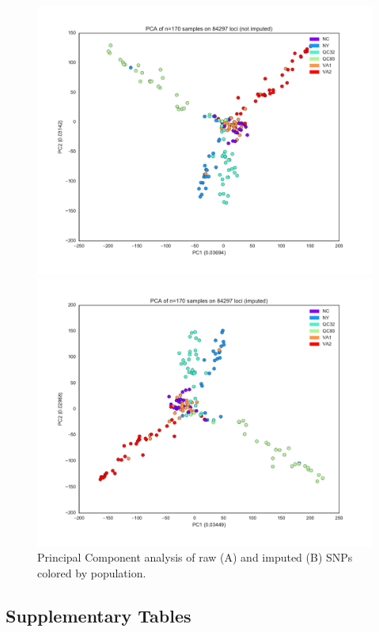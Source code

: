 \documentclass[smallextended]{svjour3}
\begin{document}
\begin{figure}
\begin{minipage}[b]{.5\linewidth}
	\centering
	\includegraphics[width=\textwidth]{not_imputed}	
	\subcaption{}
\end{minipage}
\hfill
\begin{minipage}[b]{.5\linewidth}
	\centering
	\includegraphics[width=\textwidth]{imputed}	
	\subcaption{}
\end{minipage}
\caption{Principal Component analysis of raw (A) and imputed (B) SNPs colored 
by population.}
\label{fig:pcas}
\end{figure}


\subsection*{Supplementary Tables}\label{ss:stab}
\end{document}
